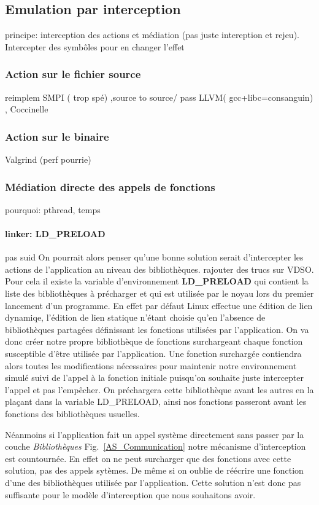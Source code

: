 \subsection{Emulation par interception}
 principe: interception des actions et médiation (pas juste intereption et rejeu). Intercepter des symbôles pour en changer l'effet

\subsubsection{Action sur le fichier source}
reimplem SMPI ( trop spé) ,source to source/ pass LLVM( gcc+libc=consanguin) 
, Coccinelle
\subsubsection{Action sur le binaire}
Valgrind (perf pourrie)

\subsubsection{Médiation directe des appels de fonctions}
pourquoi: pthread, temps

\paragraph{linker: LD\_PRELOAD}
pas suid
On pourrait alors penser qu'une bonne solution serait d'intercepter les actions
de l'application au niveau des bibliothèques.{\color{red} rajouter des trucs sur
  VDSO}. Pour cela il existe la variable d'environnement \textbf{LD\_PRELOAD}
qui contient la liste des bibliothèques à précharger et qui est utilisée par le
noyau lors du premier lancement d'un programme. En effet par défaut Linux
effectue une édition de lien dynamiqe, l'édition de lien statique n'étant
choisie qu'en l'absence de bibliothèques partagées définissant les fonctions
utilisées par l'application. On va donc créer notre propre bibliothèque de
fonctions surchargeant chaque fonction susceptible d'être utilisée par
l'application. Une fonction surchargée contiendra alors toutes les modifications
nécessaires pour maintenir notre environnement simulé suivi de l'appel à la
fonction initiale puisqu'on souhaite juste intercepter l'appel et pas
l'empêcher. On préchargera cette bibliothèque avant les autres en la plaçant
dans la variable LD\_PRELOAD, ainsi nos fonctions passeront avant les fonctions
des bibliothèques usuelles.

Néanmoins si l'application fait un appel système directement sans passer par la
couche \textit{Bibliothèques} Fig.~\ref{AS_Communication} notre mécanisme
d'interception est countournée. En effet on ne peut surcharger que des fonctions
avec cette solution, pas des appels sytèmes. De même si on oublie de réécrire
une fonction d'une des bibliothèques utilisée par l'application. Cette solution
n'est donc pas suffisante pour le modèle d'interception que nous souhaitons
avoir.

